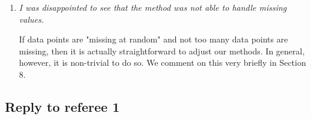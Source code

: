 \documentclass[a4paper,12pt]{article}
\begin{document}
\begin{enumerate}[label=\arabic*.,leftmargin=0.6cm]
Yes, this is suboptimal but avoids certain theoretical complications. We now mention this on p.12.



\item {\color{black}\textit{I was disappointed to see that the method was not able to handle missing values.}}

If data points are "missing at random" and not too many data points are missing, then it is actually straightforward to adjust our methods. In general, however, it is non-trivial to do so. We comment on this very briefly in Section 8.

  
\end{enumerate}

  

\subsection*{Reply to referee 1}
\end{document}
